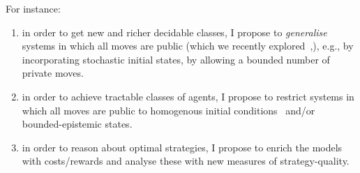 \documentclass[a4paper,12pt,smallheadings]{scrartcl}
\begin{document}
% 
% 


For instance: 
\begin{enumerate}
 \item in order to get new and richer decidable classes, I propose to \emph{generalise} systems in which all moves are public (which we recently explored~,), e.g., by incorporating stochastic initial states, by allowing a bounded number of private moves. 
 
 \item in order to achieve tractable classes of agents, I propose to restrict systems in which all moves are public to homogenous initial conditions~\cite{DBLP:journals/tocl/LomuscioMR00} and/or bounded-epistemic states.
 
%  
 \item in order to reason about optimal strategies, I propose to enrich the models with costs/rewards and analyse these with new measures of strategy-quality.
 \end{enumerate}
\end{document}
